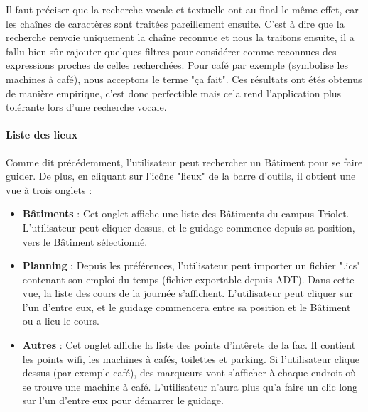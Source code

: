 \documentclass{article}
\begin{document}
	Il faut préciser que la recherche vocale et textuelle ont au final le même effet, car les chaînes de caractères sont traitées pareillement ensuite. C'est à dire que la recherche renvoie uniquement la chaîne reconnue et nous la traitons ensuite, il a fallu bien sûr rajouter quelques filtres pour considérer comme reconnues des expressions proches de celles recherchées. Pour café par exemple (symbolise les machines à café), nous acceptons le terme "ça fait". Ces résultats ont étés obtenus de manière empirique, c'est donc perfectible mais cela rend l'application plus tolérante lors d'une recherche vocale. \\
	\paragraph{Liste des lieux}
	Comme dit précédemment, l'utilisateur peut rechercher un Bâtiment pour se faire guider. De plus, en cliquant sur l'icône "lieux" de la barre d'outils, il obtient une vue à trois onglets : \\
	\begin{itemize}
		\item \textbf{Bâtiments} : Cet onglet affiche une liste des Bâtiments du campus Triolet. L'utilisateur peut cliquer dessus, et le guidage commence depuis sa position, vers le Bâtiment sélectionné.
		\item \textbf{Planning} : Depuis les préférences, l'utilisateur peut importer un fichier ".ics" contenant son emploi du temps (fichier exportable depuis ADT). Dans cette vue, la liste des cours de la journée s'affichent. L'utilisateur peut cliquer sur l'un d'entre eux, et le guidage commencera entre sa position et le Bâtiment ou a lieu le cours.
		\item \textbf{Autres} : Cet onglet affiche la liste des points d'intêrets de la fac. Il contient les points wifi, les machines à cafés, toilettes et parking.
		Si l'utilisateur clique dessus (par exemple café), des marqueurs vont s'afficher à chaque endroit où se trouve une machine à café. L'utilisateur n'aura plus qu'a faire un clic long sur l'un d'entre eux pour démarrer le guidage.
	\end{itemize}
	
\end{document}
